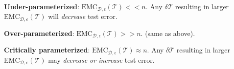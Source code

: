 \documentclass[11pt]{article}
\begin{document}
\newcommand{\emc}{\mathrm{EMC}_{\mathcal D, \epsilon}(\mathcal T)}
\begin{compactitem}
	\item \textbf{Under-parameterized}: $\emc << n$. Any $\delta \mathcal T$ resulting in larger $\emc$ will \textit{decrease} test error.
	
	\item \textbf{Over-parameterized}: $\emc >> n$. (same as above).
	
	\item \textbf{Critically parameterized}: $\emc \approx n$. Any $\delta \mathcal T$ resulting in larger $\emc$ may \textit{decrease or increase} test error.
\end{compactitem}











\end{document}
